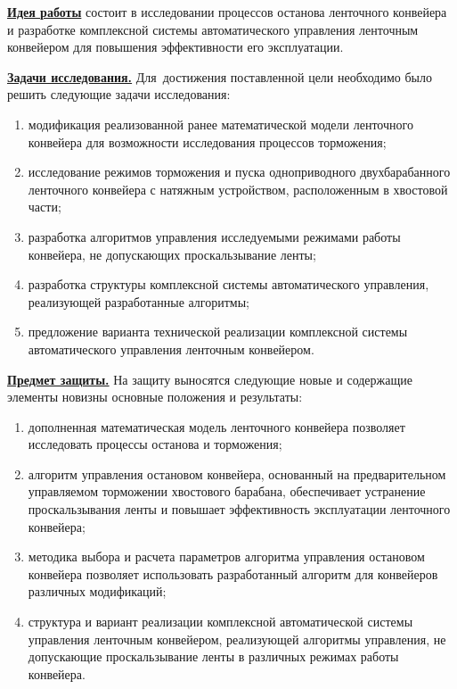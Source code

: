 \underline{\textbf{Идея работы}} состоит в исследовании процессов останова ленточного конвейера и разработке комплексной системы автоматического управления ленточным конвейером для повышения эффективности его эксплуатации.
\bigskip

\underline{\textbf{Задачи исследования.}} Для~достижения поставленной цели необходимо было решить следующие задачи исследования: 
\begin{enumerate}
	\item модификация реализованной ранее математической модели ленточного конвейера для возможности исследования процессов торможения;
	\item исследование режимов торможения и пуска одноприводного двухбарабанного ленточного конвейера с натяжным устройством, расположенным в хвостовой части;
	\item разработка алгоритмов управления исследуемыми режимами работы конвейера, не допускающих проскальзывание ленты;
	\item разработка структуры комплексной системы автоматического управления, реализующей разработанные алгоритмы;
	\item предложение варианта технической реализации комплексной системы автоматического управления ленточным конвейером.
\end{enumerate}
\bigskip

\fi

\underline{\textbf{Предмет защиты.}} На защиту выносятся следующие новые и содержащие элементы новизны основные положения и результаты:
\begin{enumerate}
	\item дополненная математическая модель ленточного конвейера позволяет исследовать процессы останова и торможения;
	\item алгоритм управления остановом конвейера, основанный на предварительном управляемом торможении хвостового барабана, обеспечивает устранение проскальзывания ленты и повышает эффективность эксплуатации ленточного конвейера;
	\item методика выбора и расчета параметров алгоритма управления остановом конвейера позволяет использовать разработанный алгоритм для конвейеров различных модификаций;
	\item структура и вариант реализации комплексной автоматической системы управления ленточным конвейером, реализующей алгоритмы  управления, не допускающие проскальзывание ленты в различных режимах работы конвейера.
\end{enumerate}
\bigskip


